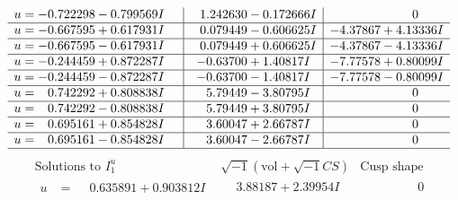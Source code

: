 \documentclass[1p]{elsarticle_modified}
\theoremstyle{definition}
\newcommand{\I}{\sqrt{-1}}
\begin{document}
$$\begin{array}{c|c|c}
\begin{aligned}
u &= -0.722298 - 0.799569 I\end{aligned}
 & \phantom{-}1.242630 - 0.172666 I & \phantom{-0.000000 } 0 \\ \hline\begin{aligned}
u &= -0.667595 + 0.617931 I\end{aligned}
 & \phantom{-}0.079449 - 0.606625 I & -4.37867 + 4.13336 I \\ \hline\begin{aligned}
u &= -0.667595 - 0.617931 I\end{aligned}
 & \phantom{-}0.079449 + 0.606625 I & -4.37867 - 4.13336 I \\ \hline\begin{aligned}
u &= -0.244459 + 0.872287 I\end{aligned}
 & -0.63700 + 1.40817 I & -7.77578 + 0.80099 I \\ \hline\begin{aligned}
u &= -0.244459 - 0.872287 I\end{aligned}
 & -0.63700 - 1.40817 I & -7.77578 - 0.80099 I \\ \hline\begin{aligned}
u &= \phantom{-}0.742292 + 0.808838 I\end{aligned}
 & \phantom{-}5.79449 - 3.80795 I & \phantom{-0.000000 } 0 \\ \hline\begin{aligned}
u &= \phantom{-}0.742292 - 0.808838 I\end{aligned}
 & \phantom{-}5.79449 + 3.80795 I & \phantom{-0.000000 } 0 \\ \hline\begin{aligned}
u &= \phantom{-}0.695161 + 0.854828 I\end{aligned}
 & \phantom{-}3.60047 + 2.66787 I & \phantom{-0.000000 } 0 \\ \hline\begin{aligned}
u &= \phantom{-}0.695161 - 0.854828 I\end{aligned}
 & \phantom{-}3.60047 - 2.66787 I & \phantom{-0.000000 } 0\\
 \hline 
 \end{array}$$\newpage$$\begin{array}{c|c|c}  
\text{Solutions to }I^u_{1}& \I (\text{vol} + \sqrt{-1}CS) & \text{Cusp shape}\\
 \hline 
\begin{aligned}
u &= \phantom{-}0.635891 + 0.903812 I\end{aligned}
 & \phantom{-}3.88187 + 2.39954 I & \phantom{-0.000000 } 0 \\ \hline\begin{aligned}

\end{aligned}
\end{array}$$
\end{document}
